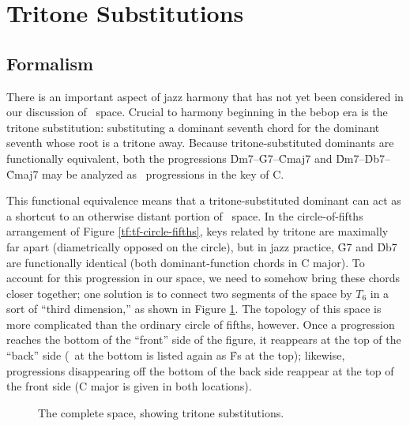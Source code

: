 



\section{Tritone Substitutions}
\label{sec:tf-space-tritones}

\subsection{Formalism}

There is an important aspect of jazz harmony that has not yet been considered in
our discussion of \tf\ space. Crucial to harmony beginning in the bebop era is
the tritone substitution: substituting a dominant seventh chord for the
dominant seventh whose root is a tritone away. Because
tritone-substituted dominants are functionally equivalent, both the
progressions \h{Dm7}--\h{G7}--\h{Cmaj7} and \h{Dm7}--\h{Db7}--\h{Cmaj7} may be
analyzed as \tfo\ progressions in the key of C.

This functional equivalence means that a tritone-substituted dominant can
act as a shortcut to an otherwise distant portion of \tf\ space. In the
circle-of-fifths arrangement of Figure \ref{tf:tf-circle-fifths}, keys related
by tritone are maximally far apart (diametrically opposed on the circle), but
in jazz practice, \h{G7} and \h{Db7} are functionally identical (both
dominant-function chords in C major). To account for this progression in our
space, we need to somehow bring these chords closer together; one solution is
to connect two segments of the space by $T_6$ in a sort of ``third
dimension,'' as shown in Figure \ref{tft:complete-space}. The topology of this
space is more complicated than the ordinary circle of fifths, however. Once a
progression reaches the bottom of the ``front'' side of the figure, it
reappears at the top of the ``back'' side (\Gflat\ at the bottom is listed
again as \h{Fs} at the top); likewise, progressions disappearing off the
bottom of the back side reappear at the top of the front side (C major is
given in both locations).

\begin{figure}[thb]
  \caption{The complete \tf space, showing tritone substitutions.}
  \label{tft:complete-space}
\end{figure}

